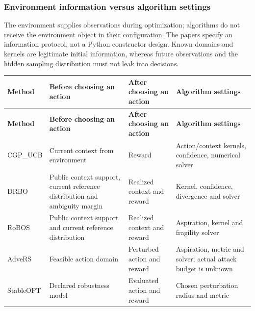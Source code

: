 \documentclass[10pt,a4paper]{article}
\begin{document}
\subsubsection*{Environment information versus algorithm settings}

The environment supplies observations during optimization; algorithms do not receive the environment object in their configuration. The papers specify an information protocol,\allowbreak{} not a Python constructor design. Known domains and kernels are legitimate initial information,\allowbreak{} whereas future observations and the hidden sampling distribution must not leak into decisions.


{\small
\begin{longtable}{@{}>{\raggedright\arraybackslash}p{0.1200\dimexpr\linewidth-6\tabcolsep\relax}>{\raggedright\arraybackslash}p{0.3000\dimexpr\linewidth-6\tabcolsep\relax}>{\raggedright\arraybackslash}p{0.2300\dimexpr\linewidth-6\tabcolsep\relax}>{\raggedright\arraybackslash}p{0.3500\dimexpr\linewidth-6\tabcolsep\relax}@{}}
\toprule
\textbf{Method} & \textbf{Before choosing an action} & \textbf{After choosing an action} & \textbf{Algorithm settings} \\
\midrule\endfirsthead
\toprule
\textbf{Method} & \textbf{Before choosing an action} & \textbf{After choosing an action} & \textbf{Algorithm settings} \\
\midrule\endhead
CGP\_\allowbreak{}UCB & Current context from environment & Reward & Action/context kernels,\allowbreak{} confidence,\allowbreak{} numerical solver \\
DRBO & Public context support,\allowbreak{} current reference distribution and ambiguity margin & Realized context and reward & Kernel,\allowbreak{} confidence,\allowbreak{} divergence and solver \\
RoBOS & Public context support and current reference distribution & Realized context and reward & Aspiration,\allowbreak{} kernel and fragility solver \\
AdveRS & Feasible action domain & Perturbed action and reward & Aspiration,\allowbreak{} metric and solver; actual attack budget is unknown \\
StableOPT & Declared robustness model & Evaluated action and reward & Chosen perturbation radius and metric \\
\bottomrule
\end{longtable}
}
\end{document}
